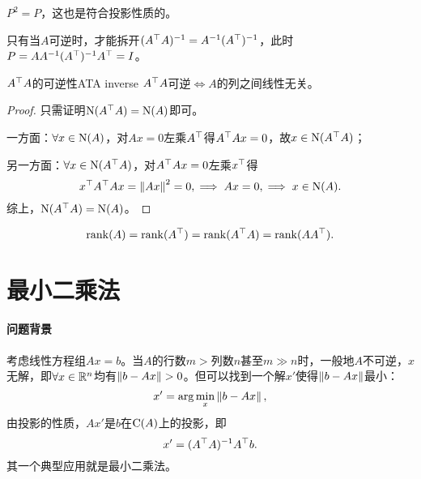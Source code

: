 \begin{corollary}
	$P^2=P$，这也是符合投影性质的。
\end{corollary}

\begin{remark}
	只有当$A$可逆时，才能拆开$(A^\top A)^{-1}=A^{-1}(A^\top)^{-1}$，此时$P=AA^{-1}(A^\top)^{-1} A^\top=I$。
\end{remark}

\begin{theorem}{$A^\top A$的可逆性}{ATA inverse}
	$A^\top A$可逆$\iff A$的列之间线性无关。
\end{theorem}
\begin{proof}
	只需证明$\operatorname{N}(A^\top A)=\operatorname{N}(A)$即可。
	
	一方面：$\forall x\in\operatorname{N}(A)$，对$Ax=0$左乘$A^\top$得$A^\top Ax=0$，故$x\in\operatorname{N}(A^\top A)$；
	
	另一方面：$\forall x\in\operatorname{N}(A^\top A)$，对$A^\top Ax=0$左乘$x^\top$得
	\[
		x^\top A^\top Ax=\left\lVert Ax\right\rVert^2=0,\implies Ax=0,\implies x\in\operatorname{N}(A).
	\]
	综上，$\operatorname{N}(A^\top A)=\operatorname{N}(A)$。
\end{proof}
\begin{corollary}
	\[
		\operatorname{rank}(A)=\operatorname{rank}(A^\top)=\operatorname{rank}(A^\top A)=\operatorname{rank}(AA^\top).
	\]
\end{corollary}

\section{最小二乘法}

\paragraph{问题背景}
考虑线性方程组$Ax=b$。当$A$的行数$m>$列数$n$甚至$m\gg n$时，一般地$A$不可逆，$x$无解，即$\forall x\in\mathbb R^n$均有$\left\lVert b-Ax\right\rVert>0$。但可以找到一个解$x'$使得$\left\lVert b-Ax\right\rVert$最小：
\[
	x'=\arg\min_x\left\lVert b-Ax\right\rVert,
\]
由投影的性质，$Ax'$是$b$在$\operatorname{C}(A)$上的投影，即
\begin{equation}
	x'=(A^\top A)^{-1} A^\top b.
\end{equation}
其一个典型应用就是最小二乘法。

